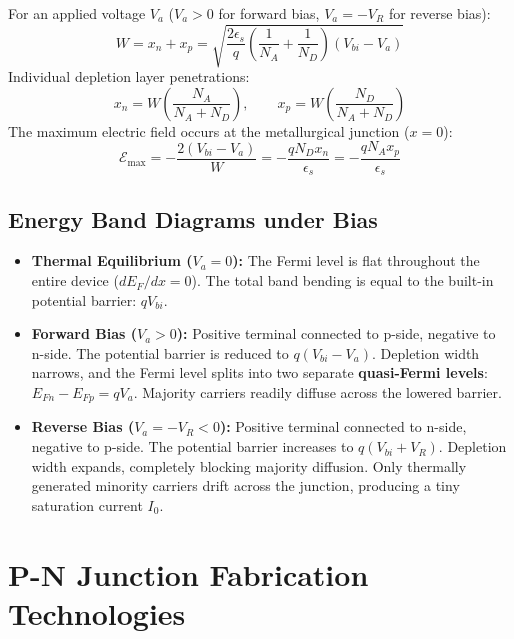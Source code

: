 \documentclass[12pt,a4paper]{article}
\begin{document}
\begin{tcolorbox}[formulabox, title={\textbf{Depletion Width and Peak Electric Field under Applied Bias $V_a$}}]
For an applied voltage $V_a$ ($V_a > 0$ for forward bias, $V_a = -V_R$ for reverse bias):
\begin{equation}
  W = x_n + x_p = \sqrt{\frac{2 \epsilon_s}{q} \left(\frac{1}{N_A} + \frac{1}{N_D}\right) (V_{bi} - V_a)}
\end{equation}
Individual depletion layer penetrations:
\begin{equation}
  x_n = W \left(\frac{N_A}{N_A + N_D}\right), \qquad x_p = W \left(\frac{N_D}{N_A + N_D}\right)
\end{equation}
The maximum electric field occurs at the metallurgical junction ($x = 0$):
\begin{equation}
  \mathcal{E}_{\text{max}} = -\frac{2 (V_{bi} - V_a)}{W} = -\frac{q N_D x_n}{\epsilon_s} = -\frac{q N_A x_p}{\epsilon_s}
\end{equation}
\end{tcolorbox}

\subsection{Energy Band Diagrams under Bias}
\begin{itemize}[leftmargin=*, itemsep=3pt]
  \item \textbf{Thermal Equilibrium ($V_a = 0$):} The Fermi level is flat throughout the entire device ($dE_F/dx = 0$). The total band bending is equal to the built-in potential barrier: $q V_{bi}$.
  \item \textbf{Forward Bias ($V_a > 0$):} Positive terminal connected to p-side, negative to n-side. The potential barrier is reduced to $q(V_{bi} - V_a)$. Depletion width narrows, and the Fermi level splits into two separate \textbf{quasi-Fermi levels}: $E_{Fn} - E_{Fp} = q V_a$. Majority carriers readily diffuse across the lowered barrier.
  \item \textbf{Reverse Bias ($V_a = -V_R < 0$):} Positive terminal connected to n-side, negative to p-side. The potential barrier increases to $q(V_{bi} + V_R)$. Depletion width expands, completely blocking majority diffusion. Only thermally generated minority carriers drift across the junction, producing a tiny saturation current $I_0$.
\end{itemize}

\section{P-N Junction Fabrication Technologies}
\end{document}
